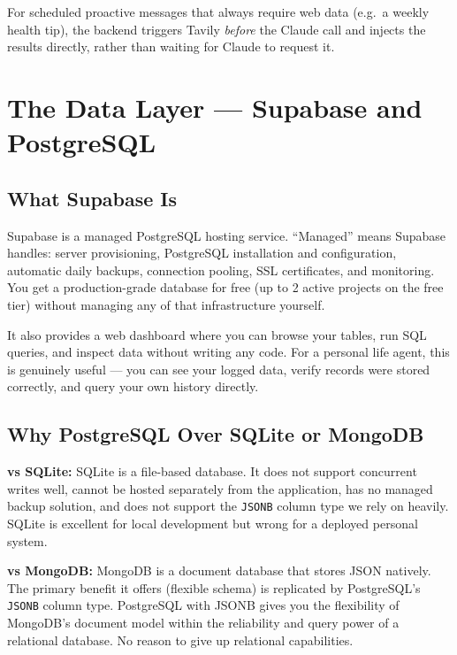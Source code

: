 \documentclass[12pt, a4paper]{article}
\begin{document}
For scheduled proactive messages that always require web data (e.g.\ a weekly health tip), the backend triggers Tavily \textit{before} the Claude call and injects the results directly, rather than waiting for Claude to request it.

\section{The Data Layer --- Supabase and PostgreSQL}

\subsection{What Supabase Is}

Supabase is a managed PostgreSQL hosting service. ``Managed'' means Supabase handles: server provisioning, PostgreSQL installation and configuration, automatic daily backups, connection pooling, SSL certificates, and monitoring. You get a production-grade database for free (up to 2 active projects on the free tier) without managing any of that infrastructure yourself.

It also provides a web dashboard where you can browse your tables, run SQL queries, and inspect data without writing any code. For a personal life agent, this is genuinely useful --- you can see your logged data, verify records were stored correctly, and query your own history directly.

\subsection{Why PostgreSQL Over SQLite or MongoDB}

\textbf{vs SQLite:} SQLite is a file-based database. It does not support concurrent writes well, cannot be hosted separately from the application, has no managed backup solution, and does not support the \texttt{JSONB} column type we rely on heavily. SQLite is excellent for local development but wrong for a deployed personal system.

\textbf{vs MongoDB:} MongoDB is a document database that stores JSON natively. The primary benefit it offers (flexible schema) is replicated by PostgreSQL's \texttt{JSONB} column type. PostgreSQL with JSONB gives you the flexibility of MongoDB's document model within the reliability and query power of a relational database. No reason to give up relational capabilities.
\end{document}

